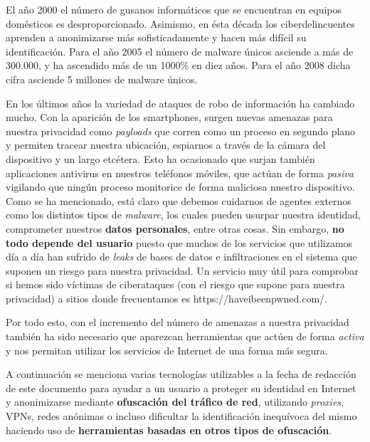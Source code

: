 El año 2000 el número de gusanos informáticos que se encuentran en equipos domésticos es desproporcionado. Asimismo, en ésta década los ciberdelincuentes aprenden a anonimizarse más sofisticadamente y hacen más difícil su identificación.
Para el año 2005 el número de malware únicos asciende a más de 300.000, y ha ascendido más de un 1000\% en diez años. Para el año 2008 dicha cifra asciende 5 millones de malware únicos.~\cite{article:number_malware}

En los últimos años la variedad de ataques de robo de información ha cambiado mucho. Con la aparición de los smartphones, surgen nuevas amenazas para nuestra privacidad como \textit{payloads} que corren como un proceso en segundo plano~\cite{article:android} y permiten tracear nuestra ubicación, espiarnos a través de la cámara del dispositivo y un largo etcétera. Esto ha ocasionado que surjan también aplicaciones antivirus en nuestros teléfonos móviles, que actúan de forma \textit{pasiva} vigilando que ningún proceso monitorice de forma maliciosa nuestro dispositivo.
Como se ha mencionado, está claro que debemos cuidarnos de agentes externos como los distintos tipos de \textit{malware}, los cuales pueden usurpar nuestra identidad, comprometer nuestros \textbf{datos personales}, entre otras cosas. 
Sin embargo, \textbf{no todo depende del usuario }puesto que muchos de los servicios que utilizamos día a día han sufrido de \textit{leaks} de bases de datos e infiltraciones en el sistema que suponen un riesgo para nuestra privacidad. Un servicio muy útil para comprobar si hemos sido víctimas de ciberataques (con el riesgo que supone para nuestra privacidad) a sitios donde frecuentamos es https://haveibeenpwned.com/.

Por todo esto, con el incremento del número de amenazas a nuestra privacidad también ha sido necesario que aparezcan herramientas que actúen de forma \textit{activa} y nos permitan utilizar los servicios de Internet de una forma más segura.

	
\label{sec:a_favor}

A continuación se menciona varias tecnologías utilizables a la fecha de redacción de este documento para ayudar a un usuario a proteger su identidad en Internet y anonimizarse mediante \textbf{ofuscación del tráfico de red}, utilizando \textit{proxies}, VPNs, redes anónimas o incluso dificultar la identificación inequívoca del mismo haciendo uso de \textbf{herramientas basadas en otros tipos de ofuscación}.

